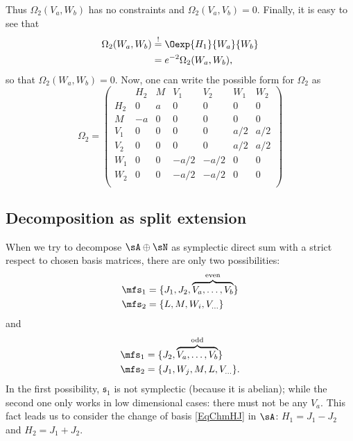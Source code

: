 Thus $\Omega_2(V_a,W_b)$ has no constraints and $\Omega_2(V_a,V_b)=0$. Finally, it is easy to see that
\begin{equation}
\begin{split}
\Omega_2(W_a,W_b)&\stackrel{!}{=}\Oexp{H_1}{W_a}{W_b}\\
                 &=e^{-2}\Omega_2(W_a,W_b),
\end{split}
\end{equation}
so that $\Omega_2(W_a,W_b)=0$. Now, one can write the possible form for $\Omega_2$ as
\begin{equation}
\Omega_2=\left(
\begin{array}{c|c|c|c|c|c|c}
 & H_2 & M & V_1 & V_2 & W_1 & W_2 \\ 
 \hline
H_2 & 0 & a & 0 & 0 & 0 & 0 \\ 
\hline
M & -a & 0 & 0 & 0 & 0 & 0 \\ 
\hline
V_1 & 0 & 0 & 0 & 0 & a/2 & a/2 \\ 
\hline
V_2 & 0 & 0 & 0 & 0 & a/2 & a/2 \\ 
\hline
W_1 & 0 & 0 & -a/2 & -a/2 & 0 & 0  \\ 
\hline
W_2 & 0 & 0 & -a/2 & -a/2 & 0 & 0  \\ 
\end{array}
\right)
\end{equation}



\subsection{Decomposition as split extension}

When we try to decompose $\sA\oplus\sN$ as symplectic direct sum with a strict respect to chosen basis matrices, there are only two possibilities:
\begin{equation}
 \begin{split}
  \mfs_1&=\{ J_1,J_2,\overbrace{V_a,\ldots,V_b}^{\text{even}}  \}\\
\mfs_2&=\{ L,M,W_i,V_{\ldots}  \}  
\end{split}   
\end{equation}
and
\begin{equation}
 \begin{split}
  \mfs_1&=\{ J_2,\overbrace{V_a,\ldots,V_b}^{\text{odd}}  \}\\
\mfs_2&=\{ J_1,W_j,M,L,V_{\ldots}  \}  .
\end{split}   
\end{equation}
In the first possibility, $\mathfrak{s}_{1}$ is not symplectic (because it is abelian); while the second one only works in low dimensional cases: there must not be any $V_a$. This fact leads us to consider  the change of basis \eqref{EqChmHJ} in $\sA$: $H_1=J_1-J_2$ and $H_2=J_1+J_2$.

